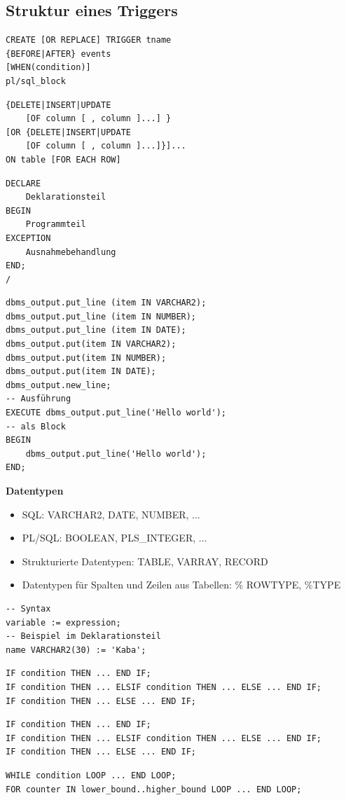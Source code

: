 \documentclass[a4paper,11pt]{article}
\begin{document}
\subsection{Struktur eines Triggers}
\begin{lstlisting}[style=sql, title=Syntax]
CREATE [OR REPLACE] TRIGGER tname
{BEFORE|AFTER} events
[WHEN(condition)]
pl/sql_block
\end{lstlisting}
\begin{lstlisting}[style=sql, title=events]
{DELETE|INSERT|UPDATE
	[OF column [ , column ]...] }
[OR {DELETE|INSERT|UPDATE
	[OF column [ , column ]...]}]...
ON table [FOR EACH ROW]
\end{lstlisting}
\begin{lstlisting}[style=sql, title=Prinzip]
DECLARE
	Deklarationsteil
BEGIN
	Programmteil
EXCEPTION
	Ausnahmebehandlung
END;
/
\end{lstlisting}
\begin{lstlisting}[style=sql, title=Bildschirmausgabe]
dbms_output.put_line (item IN VARCHAR2);
dbms_output.put_line (item IN NUMBER);
dbms_output.put_line (item IN DATE);
dbms_output.put(item IN VARCHAR2);
dbms_output.put(item IN NUMBER);
dbms_output.put(item IN DATE);
dbms_output.new_line;
-- Ausführung
EXECUTE dbms_output.put_line('Hello world');
-- als Block
BEGIN
	dbms_output.put_line('Hello world');
END;
\end{lstlisting}
\textbf{Datentypen}\\
\begin{itemize}
\item SQL: VARCHAR2, DATE, NUMBER, ...
\item PL/SQL: BOOLEAN, PLS\_INTEGER, ...
\item Strukturierte Datentypen: TABLE, VARRAY, RECORD
\item Datentypen für Spalten und Zeilen aus Tabellen: \% ROWTYPE, \%TYPE
\end{itemize}
\begin{lstlisting}[style=sql, title=Zuweisung]
-- Syntax
variable := expression;
-- Beispiel im Deklarationsteil
name VARCHAR2(30) := 'Kaba';
\end{lstlisting}
\begin{lstlisting}[style=sql, title=if then else elsif]
IF condition THEN ... END IF;
IF condition THEN ... ELSIF condition THEN ... ELSE ... END IF;
IF condition THEN ... ELSE ... END IF;
\end{lstlisting}
\begin{lstlisting}[style=sql, title=if then else elsif]
IF condition THEN ... END IF;
IF condition THEN ... ELSIF condition THEN ... ELSE ... END IF;
IF condition THEN ... ELSE ... END IF;
\end{lstlisting}
\begin{lstlisting}[style=sql, title=schleifen]
WHILE condition LOOP ... END LOOP;
FOR counter IN lower_bound..higher_bound LOOP ... END LOOP;
\end{lstlisting}
\end{document}
